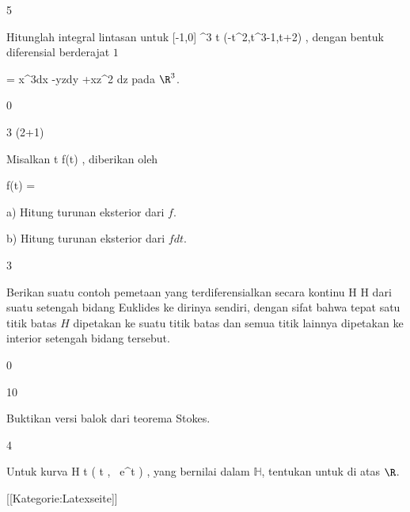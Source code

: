 {5}
{

Hitunglah integral lintasan
\mathl{\int_\gamma \omega}{} untuk
\maabbeledisp {\gamma} { [-1,0] } {\R^3
} { t } {(-t^2,t^3-1,t+2)
} {,}
dengan bentuk diferensial berderajat $1$

\mavergleichskettedisp
{\vergleichskette
{ \omega
}
{ =} { x^3dx -yzdy +xz^2 dz
}
{ } {
}
{ } {
}
{ } {
}
}
{}{}{}
pada $\R^3$.

}
{} {}

{0}
{

}
{} {}

{3 (2+1)}
{

Misalkan
 {\R} {\R
} { t } {f(t)
} {,}
diberikan oleh

\mavergleichskettedisp
{\vergleichskette
{ f(t)
}
{ =} { {  }
}
{ } {
}
{ } {
}
{ } {
}
}
{}{}{}

a) Hitung turunan eksterior dari $f$.

b) Hitung turunan eksterior dari $fdt$.

}
{} {}

{3}
{

Berikan suatu contoh pemetaan yang terdiferensialkan secara kontinu
\maabbdisp {\varphi} { H } { H
} {}
dari suatu setengah bidang Euklides ke dirinya sendiri, dengan sifat bahwa tepat satu titik batas $H$ dipetakan ke suatu titik batas dan semua titik lainnya dipetakan ke interior setengah bidang tersebut.

}
{} {}

{0}
{

}
{} {}

{10}
{

Buktikan versi balok dari teorema Stokes.

}
{} {}

{4}
{

Untuk kurva
\maabbeledisp {\psi} {\R} { {\mathbb H}
} { t } { \left(  t   , \,  e^t                   \right)
} {,}
yang bernilai dalam
${\mathbb H}$, tentukan
untuk
 {} {}
di atas $\R$.

}
{} {}

 [[Kategorie:Latexseite]]
